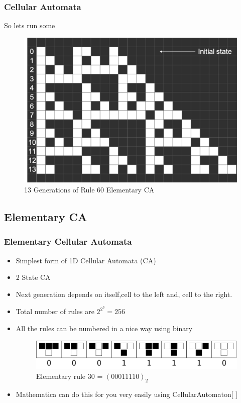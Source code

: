 \documentclass{beamer}
\begin{document}
\begin{frame}
    \frametitle{Cellular Automata}
    So lets run some 
    \begin{figure}
        \includegraphics[scale=0.42]{fig3.png}
        \caption{13 Generations of Rule 60 Elementary CA}
    \end{figure}
\end{frame}

\subsection{Elementary CA}
\begin{frame}
    \frametitle{Elementary Cellular Automata}
    \begin{itemize}
        \item Simplest form of 1D Cellular Automata (CA)
        \item 2 State CA
        \item Next generation depends on itself,cell to the left and, cell to the right.
        \item Total number of rules are $2^{2^3} = 256$
        \item All the rules can be numbered in a nice way using binary
        \begin{figure}[H]
            \includegraphics[scale=0.5]{fig1.png}
            \caption{Elementary rule 30 = $(00011110)_2$}
        \end{figure}
        \item Mathematica can do this for you very easily using CellularAutomaton[ ]
    \end{itemize}
\end{frame}
\end{document}
